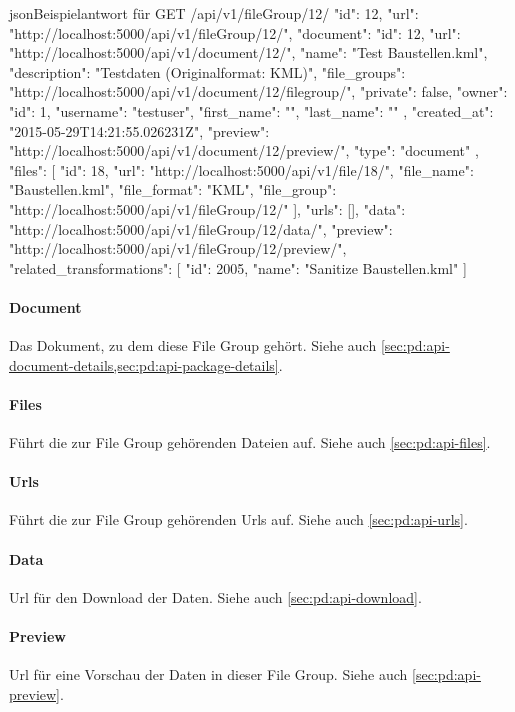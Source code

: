 \begin{srclst}{json}{Beispielantwort für GET /api/v1/fileGroup/12/}
{
      "id": 12, 
      "url": "http://localhost:5000/api/v1/fileGroup/12/", 
      "document": {
          "id": 12, 
          "url": "http://localhost:5000/api/v1/document/12/", 
          "name": "Test Baustellen.kml", 
          "description": "Testdaten (Originalformat: KML)", 
          "file_groups": "http://localhost:5000/api/v1/document/12/filegroup/", 
          "private": false, 
          "owner": {
              "id": 1, 
              "username": "testuser", 
              "first_name": "", 
              "last_name": ""
          }, 
          "created_at": "2015-05-29T14:21:55.026231Z", 
          "preview": "http://localhost:5000/api/v1/document/12/preview/", 
          "type": "document"
      }, 
      "files": [
          {
              "id": 18, 
              "url": "http://localhost:5000/api/v1/file/18/", 
              "file_name": "Baustellen.kml", 
              "file_format": "KML", 
              "file_group": "http://localhost:5000/api/v1/fileGroup/12/"
          }
      ], 
      "urls": [], 
      "data": "http://localhost:5000/api/v1/fileGroup/12/data/", 
      "preview": "http://localhost:5000/api/v1/fileGroup/12/preview/", 
      "related_transformations": [
          {
              "id": 2005, 
              "name": "Sanitize Baustellen.kml"
          }
      ]
  }
\end{srclst}

\paragraph{Document} Das Dokument, zu dem diese File Group gehört. Siehe auch \cref{sec:pd:api-document-details,sec:pd:api-package-details}.
\paragraph{Files} Führt die zur File Group gehörenden Dateien auf. Siehe auch \cref{sec:pd:api-files}.
\paragraph{Urls} Führt die zur File Group gehörenden Urls auf. Siehe auch \cref{sec:pd:api-urls}.
\paragraph{Data} Url für den Download der Daten. Siehe auch \cref{sec:pd:api-download}.
\paragraph{Preview} Url für eine Vorschau der Daten in dieser File Group. Siehe auch \cref{sec:pd:api-preview}.

